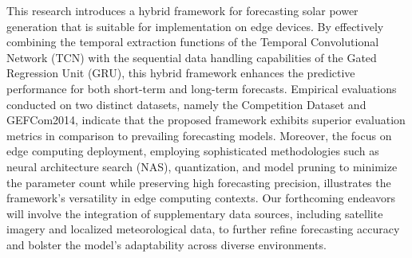 \documentclass[sn-mathphys-num]{sn-jnl}%
\begin{document}
This research introduces a hybrid framework for forecasting solar power generation that is suitable for implementation on edge devices. By effectively combining the temporal extraction functions of the Temporal Convolutional Network (TCN) with the sequential data handling capabilities of the Gated Regression Unit (GRU), this hybrid framework enhances the predictive performance for both short-term and long-term forecasts. Empirical evaluations conducted on two distinct datasets, namely the Competition Dataset and GEFCom2014, indicate that the proposed framework exhibits superior evaluation metrics in comparison to prevailing forecasting models. Moreover, the focus on edge computing deployment, employing sophisticated methodologies such as neural architecture search (NAS), quantization, and model pruning to minimize the parameter count while preserving high forecasting precision, illustrates the framework's versatility in edge computing contexts. Our forthcoming endeavors will involve the integration of supplementary data sources, including satellite imagery and localized meteorological data, to further refine forecasting accuracy and bolster the model's adaptability across diverse environments.





%

%





\end{document}
